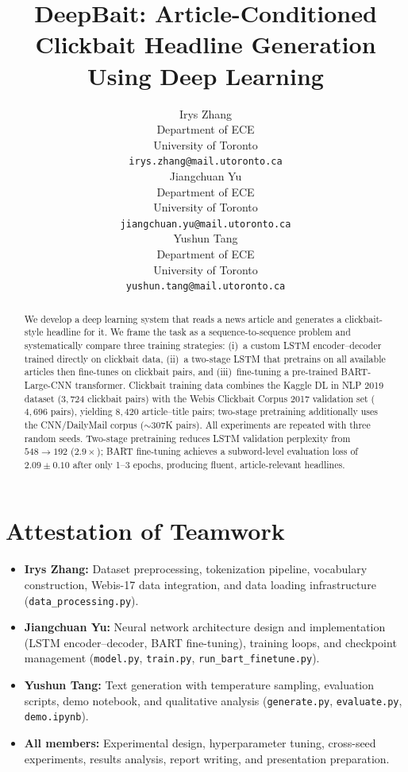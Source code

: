 \documentclass{article}
\title{DeepBait: Article-Conditioned Clickbait Headline Generation Using Deep Learning}
\author{%
  Irys Zhang\\
  Department of ECE\\
  University of Toronto\\
  \texttt{irys.zhang@mail.utoronto.ca} \\
  \And
  Jiangchuan Yu\\
  Department of ECE\\
  University of Toronto\\
  \texttt{jiangchuan.yu@mail.utoronto.ca} \\
  \And
  Yushun Tang\\
  Department of ECE\\
  University of Toronto\\
  \texttt{yushun.tang@mail.utoronto.ca} \\
}
\begin{document}
\maketitle


\begin{abstract}
We develop a deep learning system that reads a news article and generates a clickbait-style headline for it.
We frame the task as a sequence-to-sequence problem and systematically compare three training strategies:
(i)~a custom LSTM encoder--decoder trained directly on clickbait data,
(ii)~a two-stage LSTM that pretrains on all available articles then fine-tunes on clickbait pairs, and
(iii)~fine-tuning a pre-trained BART-Large-CNN transformer.
Clickbait training data combines the Kaggle DL in NLP 2019 dataset ($3{,}724$ clickbait pairs) with the Webis Clickbait Corpus 2017 validation set ($4{,}696$ pairs), yielding $8{,}420$ article--title pairs; two-stage pretraining additionally uses the CNN/DailyMail corpus (${\sim}307$K pairs).
All experiments are repeated with three random seeds.
Two-stage pretraining reduces LSTM validation perplexity from $548 \rightarrow 192$ ($2.9\times$); BART fine-tuning achieves a subword-level evaluation loss of $2.09 \pm 0.10$ after only 1--3 epochs, producing fluent, article-relevant headlines.
\end{abstract}

\section*{Attestation of Teamwork}
\begin{itemize}
\item \textbf{Irys Zhang:} Dataset preprocessing, tokenization pipeline, vocabulary construction, Webis-17 data integration, and data loading infrastructure (\texttt{data\_processing.py}).
\item \textbf{Jiangchuan Yu:} Neural network architecture design and implementation (LSTM encoder--decoder, BART fine-tuning), training loops, and checkpoint management (\texttt{model.py}, \texttt{train.py}, \texttt{run\_bart\_finetune.py}).
\item \textbf{Yushun Tang:} Text generation with temperature sampling, evaluation scripts, demo notebook, and qualitative analysis (\texttt{generate.py}, \texttt{evaluate.py}, \texttt{demo.ipynb}).
\item \textbf{All members:} Experimental design, hyperparameter tuning, cross-seed experiments, results analysis, report writing, and presentation preparation.
\end{itemize}
\end{document}

